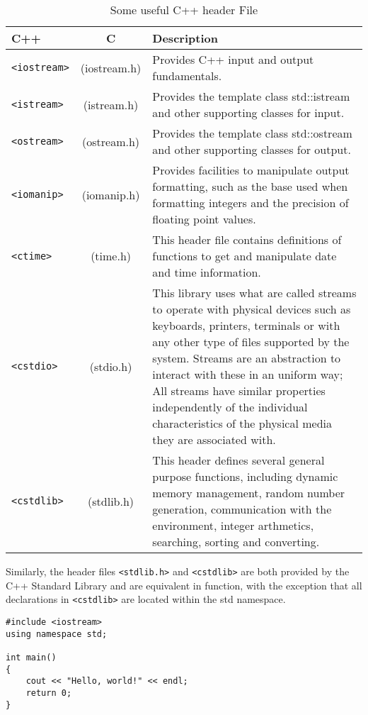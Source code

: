 \documentclass[12pt,a4paper]{article}
\begin{document}
\begin{table}[H]
\begin{center}
\vspace{0.3cm}
	\begin{tabular}{lcp{10cm}}
	\hline \hline
		\textbf{C++} \rule{0pt}{2.6ex} & \textbf{C} & \textbf{Description}\\
		\hline
		\verb|<iostream>| \rule{0pt}{2.6ex} & (iostream.h) & Provides C++ input and output fundamentals.\\
		\verb|<istream>| & (istream.h) & Provides the template class std::istream and other supporting classes for input.\\
		\verb|<ostream>| & (ostream.h) & Provides the template class std::ostream and other supporting classes for output.\\
		\verb|<iomanip>| & (iomanip.h) & Provides facilities to manipulate output formatting, such as the base used when formatting integers and the precision of floating point values.\\
		\verb|<ctime>|   & (time.h) & This header file contains definitions of functions to get and manipulate date and time information.\\
		\verb|<cstdio>| & (stdio.h) &  This library uses what are called streams to operate with physical devices such as keyboards, printers, terminals or with any other type of files supported by the system. Streams are an abstraction to interact with these in an uniform way; All streams have similar properties independently of the individual characteristics of the physical media they are associated with.\\
		\verb|<cstdlib>| &(stdlib.h)& This header defines several general purpose functions, including dynamic memory management, random number generation, communication with the environment, integer arthmetics, searching, sorting and converting.\\
		
	\hline \hline
	\end{tabular}
\end{center}
\label{Some useful C++ header File}
\caption{Some useful C++ header File}
\end{table}

Similarly, the header files \verb|<stdlib.h>| and \verb|<cstdlib>| are both provided by the C++ Standard Library and are equivalent in function, with the exception that all declarations in \verb|<cstdlib>| are located within the std namespace.\\
\begin{lstlisting}[caption={Example: Hello World Program}]
#include <iostream> 
using namespace std; 

int main() 
{ 
	cout << "Hello, world!" << endl; 
	return 0; 
}
\end{lstlisting}
\end{document}
